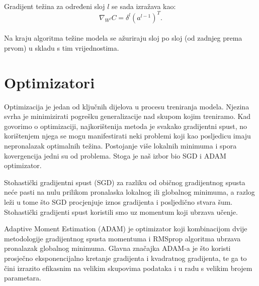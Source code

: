 		\noindent\\Gradijent težina za određeni sloj \(l\) se sada izražava kao:
		\[\nabla _{W^{l}}C=\delta ^{l}(a^{l-1})^{T}.\]
		\noindent\\Na kraju algoritma težine modela se ažuriraju sloj po sloj (od zadnjeg prema prvom) u skladu s tim vrijednostima.  


\section{Optimizatori}

Optimizacija je jedan od ključnih dijelova u procesu treniranja modela. Njezina svrha je minimizirati pogrešku generalizacije nad skupom kojim treniramo.
Kad govorimo o optimizaciji, najkorištenija metoda je svakako gradijentni spust, no korištenjem njega se mogu manifestirati neki problemi koji kao posljedicu imaju nepronalazak optimalnih težina. Postojanje više lokalnih minimuma i spora kovergencija jedni su od problema. Stoga je naš izbor bio SGD i ADAM optimizator. 

Stohastički gradijentni spust (SGD) za razliku od običnog gradijentnog spusta neće pasti na nulu prilikom pronalaska lokalnog ili globalnog minimuma, a razlog leži u tome što SGD procjenjuje iznos gradijenta i posljedično stvara šum.
Stohastički gradijenti spust koristili smo uz momentum koji ubrzava učenje. 

Adaptive Moment Estimation (ADAM) je optimizator koji kombinacijom dvije metodologije gradijentnog spusta momentuma i RMSprop algoritma ubrzava pronalazak globalnog minimuma. Glavna značajka ADAM-a je što koristi prosječno eksponencijalno kretanje gradijenta i kvadratnog gradijenta, te ga to čini izrazito efikasnim na velikim skupovima podataka i
u radu s velikim brojem parametara. 